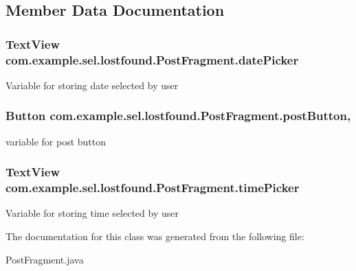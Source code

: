 \subsection{Member Data Documentation}
\hypertarget{classcom_1_1example_1_1sel_1_1lostfound_1_1PostFragment_a1c187b07da5262cf568439018a826ef9}{
\subsubsection[{date\-Picker}]{\setlength{\rightskip}{0pt plus 5cm}Text\-View com.\-example.\-sel.\-lostfound.\-Post\-Fragment.\-date\-Picker\hspace{0.3cm}{\ttfamily [static]}}}\label{classcom_1_1example_1_1sel_1_1lostfound_1_1PostFragment_a1c187b07da5262cf568439018a826ef9}
Variable for storing date selected by user \hypertarget{classcom_1_1example_1_1sel_1_1lostfound_1_1PostFragment_ab2d93225b515c22ccd209e1382e1a4a1}{
\subsubsection[{post\-Button}]{\setlength{\rightskip}{0pt plus 5cm}Button com.\-example.\-sel.\-lostfound.\-Post\-Fragment.\-post\-Button\hspace{0.3cm}{\ttfamily [static]}, {\ttfamily [protected]}}}\label{classcom_1_1example_1_1sel_1_1lostfound_1_1PostFragment_ab2d93225b515c22ccd209e1382e1a4a1}
variable for post button \hypertarget{classcom_1_1example_1_1sel_1_1lostfound_1_1PostFragment_ac6d98a5b689bea76cf1248a20a54d23c}{
\subsubsection[{time\-Picker}]{\setlength{\rightskip}{0pt plus 5cm}Text\-View com.\-example.\-sel.\-lostfound.\-Post\-Fragment.\-time\-Picker\hspace{0.3cm}{\ttfamily [static]}}}\label{classcom_1_1example_1_1sel_1_1lostfound_1_1PostFragment_ac6d98a5b689bea76cf1248a20a54d23c}
Variable for storing time selected by user 

The documentation for this class was generated from the following file\-:\begin{DoxyCompactItemize}
\item 
Post\-Fragment.\-java\end{DoxyCompactItemize}
